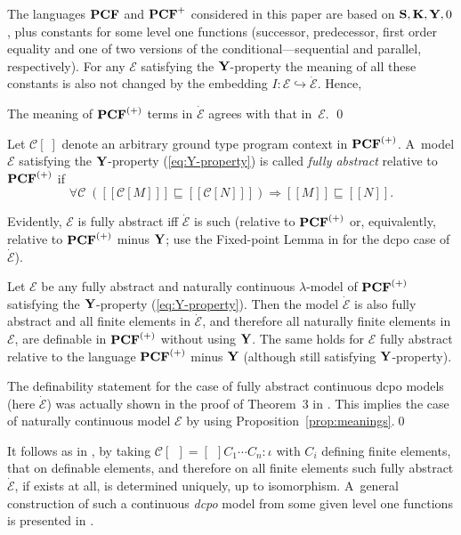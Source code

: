 \documentclass[fleqn]{LMCS}
\theoremstyle{plain}\newtheorem{satz}[thm]{Satz}
\theoremstyle{plain}\newtheorem{hyp}[thm]{Hypothesis}
\theoremstyle{plain}\newtheorem{hyps}[thm]{Hypotheses}
\theoremstyle{definition}\newtheorem{note}[thm]{Note}
\newcommand{\EE}{\mathcal{E}}
\newcommand{\Arrr}{\Longrightarrow}
\newcommand{\embed}{\hookrightarrow}
\newcommand{\Dsem}[1]{[\![ #1 ]\!]}
\newcommand{\PCF}{\mbox{\bf PCF}}
\newcommand{\K}{\mbox{\bf K}}
\newcommand{\Ss}{\mbox{\bf S}}
\newcommand{\Y}{\mbox{\bf Y}}
\newcommand{\CC}{{\mathcal C}}
\newcommand{\dEE}{\dot{\EE}}
\newcommand{\sqle}{\sqsubseteq}
\newcommand{\?}{\mbox{?}}
\begin{document}
The languages $\PCF$ and $\PCF^+$ \cite{Plotkin77,Longley-Plotkin} 
considered in this paper are based on $\Ss,\K,\Y,0$, 
plus constants for some level one functions 
(successor, predecessor, first order equality and one of two versions 
of the conditional---sequential and parallel, respectively).
For any $\EE$ satisfying the $\Y$-property the meaning of all these constants 
is also not changed by the embedding $I:\EE\embed\dEE$. 
Hence, 
\begin{prop}\label{prop:meanings}
The meaning of\/ $\PCF^{(+)}$ terms in $\dEE$ 
agrees with that in~$\EE$.
\qed 
\end{prop}
\begin{defi}\label{def:full-abstract}Let $\CC[\;]$ denote an arbitrary ground type program context in $\PCF^{(+)}$. 
A~model $\EE$ satisfying the $\Y$-property (\ref{eq:Y-property}) 
is called \emph{fully abstract} relative to $\PCF^{(+)}$ if  
\[
\forall
\CC\;(\Dsem{\CC[M]}\sqle\Dsem{\CC[N]})\Arrr\Dsem{M}\sqle\Dsem{N}. 
\]
\end{defi}
\noindent
Evidently, $\EE$ is fully abstract iff $\dEE$ is such 
(relative to $\PCF^{(+)}$ or, equivalently, relative to $\PCF^{(+)}$ minus $\Y$; 
use the Fixed-point Lemma in \cite{Milner77} for the dcpo case of $\dEE$). 

\begin{prop}
Let $\EE$ be any fully abstract and 
naturally continuous $\lambda$-model of\/ $\PCF^{(+)}$ 
satisfying the $\Y$-property (\ref{eq:Y-property}). 
Then the model $\dEE$ is also fully abstract and 
all finite elements in $\dEE$, and therefore all naturally finite elements in $\EE$, 
are definable in\/ $\PCF^{(+)}$ without using\/ $\Y$. 
The same holds for $\EE$ fully abstract relative to 
the language $\PCF^{(+)}$ minus\/ $\Y$ 
(although still satisfying $\Y$-property). 
\end{prop}
\proof  
The definability statement for the case of fully abstract continuous dcpo models 
(here $\dEE$) was actually shown in the proof of Theorem~3 in  \cite{Milner77}. 
This implies the case of naturally continuous model $\EE$ by using 
Proposition~\ref{prop:meanings}.\qed


\noindent
It follows as in \cite{Milner77}, by taking $\CC[\ \ ]=[\ \ ]C_1\cdots C_n:\iota$ 
with $C_i$ defining finite elements, that on definable elements, 
and therefore on all finite elements such fully abstract $\dEE$, if exists at all, 
is determined uniquely, up to isomorphism. A~general construction of such a 
continuous \emph{dcpo} model from some given level one functions is presented 
in \cite{Milner77}. 
\end{document}
